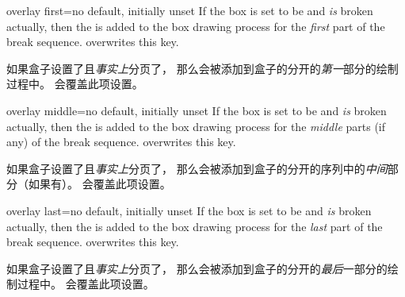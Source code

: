 \begin{docTcbKey}{overlay first}{=}{no default, initially unset}
 If the box is set to be  and \emph{is} broken actually,
 then the  is added to the box drawing process for
 the \emph{first} part of the break sequence.
  overwrites this key.


如果盒子设置了且\emph{事实上}分页了，
那么会被添加到盒子的分开的\emph{第一}部分的绘制过程中。
会覆盖此项设置。
\end{docTcbKey}

\begin{docTcbKey}{overlay middle}{=}{no default, initially unset}
 If the box is set to be  and \emph{is} broken actually,
 then the  is added to the box drawing process for
 the \emph{middle} parts (if any) of the break sequence.
  overwrites this key.


如果盒子设置了且\emph{事实上}分页了，
那么会被添加到盒子的分开的序列中的\emph{中间}部分（如果有）。 会覆盖此项设置。
\end{docTcbKey}

\begin{docTcbKey}{overlay last}{=}{no default, initially unset}
 If the box is set to be  and \emph{is} broken actually,
 then the  is added to the box drawing process for
 the \emph{last} part of the break sequence.
  overwrites this key.


如果盒子设置了且\emph{事实上}分页了，
那么会被添加到盒子的分开的\emph{最后}一部分的绘制过程中。
会覆盖此项设置。
\end{docTcbKey}


